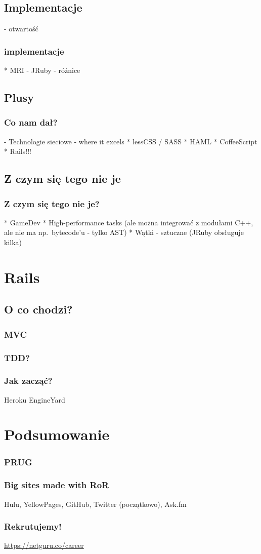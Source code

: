 \documentclass{beamer}
\begin{document}
\subsection{Implementacje}
 - otwartość

\begin{frame}[fragile]
\frametitle{implementacje}
    * MRI
    - JRuby - różnice
\end{frame}



\subsection{Plusy}

\begin{frame}[fragile]
\frametitle{Co nam dał?}

- Technologie sieciowe - where it excels
* lessCSS / SASS
* HAML
* CoffeeScript
* Rails!!!
\end{frame}

\subsection{Z czym się tego nie je}

\begin{frame}[fragile]
\frametitle{Z czym się tego nie je?}
    * GameDev
    * High-performance tasks (ale można integrować z modułami C++, ale nie ma np.\ bytecode'u - tylko AST)
    * Wątki - sztuczne (JRuby obsługuje kilka)
\end{frame}

\section{Rails}
\subsection{O co chodzi?}
\begin{frame}[fragile]
\frametitle{MVC}

\end{frame}

\begin{frame}[fragile]
\frametitle{TDD?}
\end{frame}

\begin{frame}[fragile]
\frametitle{Jak zacząć?}

Heroku 
EngineYard
\end{frame}



\section{Podsumowanie}

\begin{frame}[fragile]
\frametitle{PRUG}
\end{frame}

\begin{frame}[fragile]
\frametitle{Big sites made with RoR}
Hulu, YellowPages, GitHub, Twitter (początkowo), Ask.fm
\end{frame}

\begin{frame}[fragile]
\frametitle{Rekrutujemy!}
\url{https://netguru.co/career}
\end{frame}
\end{document}
